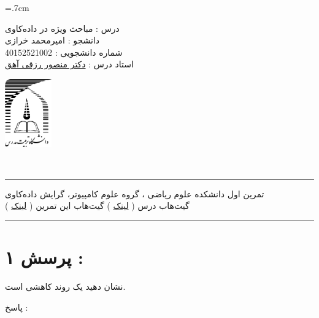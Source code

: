\documentclass[a4paper, 12pt]{article}
\begin{document}
	
	\noindent
	\begin{minipage}[c]{5cm}
		\baselineskip=.7cm
		\begin{flushright}
			درس : مباحث ویژه در داده‌کاوی
			\\
			دانشجو :
			امیرمحمد خرازی
			\\
			شماره دانشجویی :
			40152521002 
			\\
			استاد درس :  
			\href{mrezghi.ir}{دکتر منصور رزقی آهق}
		\end{flushright}
	\end{minipage}
	\hfill
	\begin{minipage}[c]{3cm}
		\begin{center}
			\href{modares.ac.ir}{
				\includegraphics[width=2cm]{logo.png}}
		\end{center}	
	\end{minipage}
	\\[1mm]
	\hrule depth .5mm \relax
	\begin{flushright}
		تمرین اول
		\hfill
		دانشکده علوم ریاضی ، گروه علوم کامپیوتر، گرایش داده‌کاوی
		\\
		\vspace{5mm}
		گیت‌هاب درس (
		\href{}{لینک}
		)
		\hfill
		گیت‌هاب این تمرین (
		\href{}{لینک}
		)
	\end{flushright}
	
	\hrule depth .5mm\relax
	
	\section*{پرسش ۱ : }
	نشان دهید 
	یک روند کاهشی است.
	
	\vspace{5mm}
	پاسخ :
	
\end{document}
